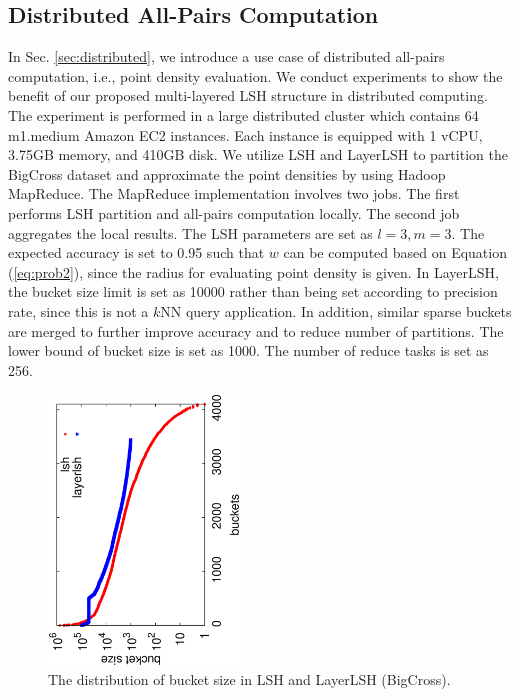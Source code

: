 \subsection{Distributed All-Pairs Computation}
\label{sec:expr:allpair}

In Sec. \ref{sec:distributed}, we introduce a use case of distributed all-pairs computation, i.e., point density evaluation. We conduct experiments to show the benefit of our proposed multi-layered LSH structure in distributed computing. The experiment is performed in a large distributed cluster which contains 64 m1.medium Amazon EC2 instances. Each instance is equipped with 1 vCPU, 3.75GB memory, and 410GB disk. We utilize LSH and LayerLSH to partition the BigCross dataset and approximate the point densities by using Hadoop MapReduce. The MapReduce implementation involves two jobs. The first performs LSH partition and all-pairs computation locally. The second job aggregates the local results. The LSH parameters are set as $l=3, m=3$. The expected accuracy is set to 0.95 such that $w$ can be computed based on Equation (\ref{eq:prob2}), since the radius for evaluating point density is given. In LayerLSH, the bucket size limit is set as 10000 rather than being set according to precision rate, since this is not a $k$NN query application. In addition, similar sparse buckets are merged to further improve accuracy and to reduce number of partitions. The lower bound of bucket size is set as 1000. The number of reduce tasks is set as 256.

\begin{figure}[t]
    \centerline{\includegraphics[angle=-90, width=2in]{fig/amazon_buckets.eps}}
    \caption{The distribution of bucket size in LSH and LayerLSH (BigCross).}
    \label{fig:amazon_buckets}
\end{figure}

